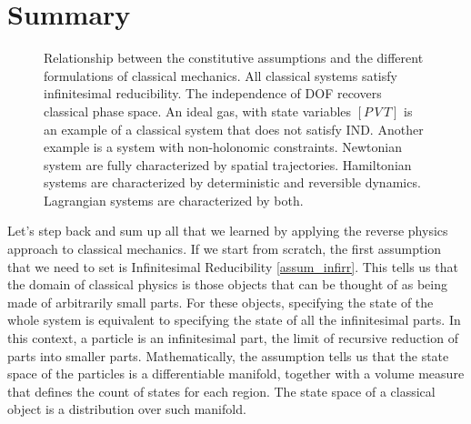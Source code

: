 \section{Summary}
\begin{figure}
	\centering
	\caption {Relationship between the constitutive assumptions and the different formulations of classical mechanics. All classical systems satisfy infinitesimal reducibility. The independence of DOF recovers classical phase space. An ideal gas, with state variables $[P \, V \, T]$ is an example of a classical system that does not satisfy IND. Another example is a system with non-holonomic constraints. Newtonian system are fully characterized by spatial trajectories. Hamiltonian systems are characterized by deterministic and reversible dynamics. Lagrangian systems are characterized by both.}
\end{figure}
Let's step back and sum up all that we learned by applying the reverse physics approach to classical mechanics. If we start from scratch, the first assumption that we need to set is Infinitesimal Reducibility \ref{assum_infirr}. This tells us that the domain of classical physics is those objects that can be thought of as being made of arbitrarily small parts. For these objects, specifying the state of the whole system is equivalent to specifying the state of all the infinitesimal parts. In this context, a particle is an infinitesimal part, the limit of recursive reduction of parts into smaller parts. Mathematically, the assumption tells us that the state space of the particles is a differentiable manifold, together with a volume measure that defines the count of states for each region. The state space of a classical object is a distribution over such manifold.

